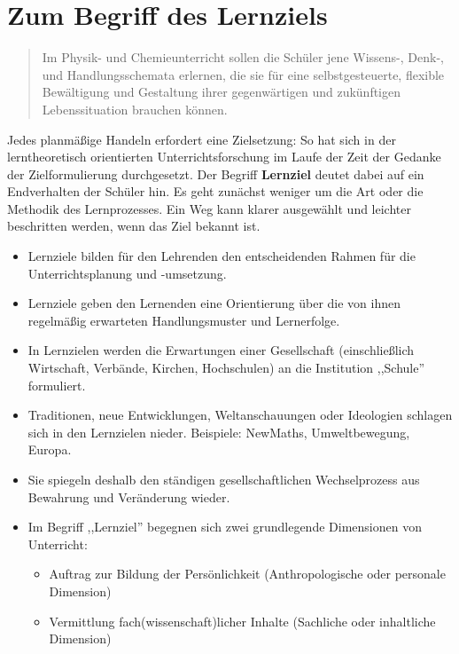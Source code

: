 \chapter{Zum Begriff des Lernziels}\label{Lernziel}\label{Ziele}

\begin{quote}
	Im Physik- und Chemieunterricht sollen die Sch\"{u}ler jene Wissens-, Denk-, und Handlungsschemata erlernen, die sie f\"{u}r eine selbstgesteuerte, flexible Bew\"{a}ltigung und Gestaltung ihrer gegenw\"{a}rtigen und zuk\"{u}nftigen Lebenssituation brauchen k\"{o}nnen.
\end{quote}

Jedes planm\"{a}{\ss}ige Handeln erfordert eine Zielsetzung:
So hat sich in der lerntheoretisch orientierten Unterrichtsforschung im Laufe der Zeit der Gedanke
der Zielformulierung durchgesetzt.
\mip
Der Begriff {\bf Lernziel} deutet dabei auf ein Endverhalten
der Sch\"{u}ler hin. Es geht zun\"{a}chst weniger um die Art oder die Methodik
des Lernprozesses.
\mip
Ein Weg kann klarer ausgew\"{a}hlt und leichter beschritten werden,
wenn das Ziel bekannt ist.

\begin{itemize}
	\item Lernziele bilden f\"{u}r den Lehrenden den entscheidenden Rahmen f\"{u}r die
	Unterrichtsplanung und -umsetzung.
	\item Lernziele geben den Lernenden eine Orientierung über die von ihnen regelmäßig erwarteten Handlungsmuster und Lernerfolge.
	\item In Lernzielen werden die Erwartungen einer Gesellschaft
	(einschlie{\ss}lich Wirtschaft, Verb\"{a}nde, Kirchen, Hochschulen) an
	die Institution ,,Schule'' formuliert.
	\item Traditionen, neue Entwicklungen, Weltanschauungen oder
	Ideologien schlagen sich in den Lernzielen nieder.
	Beispiele: NewMaths, Umweltbewegung, Europa.
	\item
	Sie spiegeln deshalb den st\"{a}ndigen gesellschaftlichen
	Wechselprozess aus Bewahrung und Ver\"{a}nderung wieder.
	\item
	Im Begriff ,,Lernziel'' begegnen sich zwei grundlegende
	Dimensionen von Unterricht:
	
	\begin{itemize}
		\item
		Auftrag zur Bildung der Pers\"{o}nlichkeit
		(Anthropologische oder personale Dimension)
		\item
		Vermittlung fach(wissenschaft)licher Inhalte (Sachliche
		oder inhaltliche Dimension)
	\end{itemize}

\end{itemize}

